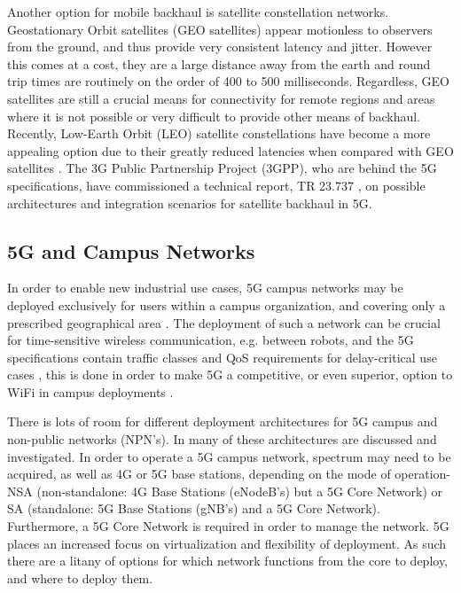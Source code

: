 Another option for mobile backhaul is satellite constellation networks. Geostationary Orbit satellites (GEO satellites) appear motionless to observers from the ground, and thus provide very consistent latency and jitter. However this comes at a cost, they are a large distance away from the earth and round trip times are routinely on the order of 400 to 500 milliseconds. Regardless, GEO satellites are still a crucial means for connectivity for remote regions and areas where it is not possible or very difficult to provide other means of backhaul. Recently, Low-Earth Orbit (LEO) satellite constellations have become a more appealing option due to their greatly reduced latencies when compared with GEO satellites \cite{deutschmann2022broadband}. The 3G Public Partnership Project (3GPP), who are behind the 5G specifications, have commissioned a technical report, TR 23.737 \cite{3gpp.23.737}, on possible architectures and integration scenarios for satellite backhaul in 5G.

\subsection{5G and Campus Networks}

In order to enable new industrial use cases, 5G campus networks may be deployed exclusively for users within a campus organization, and covering only a prescribed geographical area \cite{rischke20215g}. The deployment of such a network can be crucial for time-sensitive wireless communication, e.g. between robots, and the 5G specifications contain traffic classes and QoS requirements for delay-critical use cases \cite{3gpp.23.501}, this is done in order to make 5G a competitive, or even superior, option to WiFi in campus deployments \cite{walia20175g}.

There is lots of room for different deployment architectures for 5G campus and non-public networks (NPN's). In \cite{prados20215g} many of these architectures are discussed and investigated. In order to operate a 5G campus network, spectrum may need to be acquired, as well as 4G or 5G base stations, depending on the mode of operation- NSA (non-standalone: 4G Base Stations (eNodeB's) but a 5G Core Network) or SA (standalone: 5G Base Stations (gNB's) and a 5G Core Network). Furthermore, a 5G Core Network is required in order to manage the network. 5G places an increased focus on virtualization and flexibility of deployment. As such there are a litany of options for which network functions from the core to deploy, and where to deploy them.

